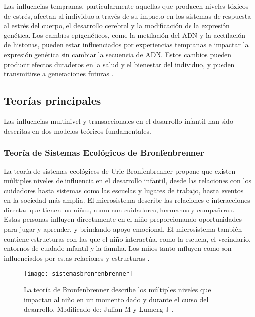 Las influencias tempranas, particularmente aquellas que producen niveles
tóxicos de estrés, afectan al individuo a través de su impacto en los sistemas
de respuesta al estrés del cuerpo, el desarrollo cerebral y la modificación de
la expresión genética. Los cambios epigenéticos, como la metilación del ADN y
la acetilación de histonas, pueden estar influenciados por experiencias
tempranas e impactar la expresión genética sin cambiar la secuencia de ADN.
Estos cambios pueden producir efectos duraderos en la salud y el bienestar del
individuo, y pueden transmitirse a generaciones futuras \cite{Nelson19}.

\subsection{Teorías principales}
Las influencias multinivel y transaccionales en el desarrollo infantil han sido
descritas en dos modelos teóricos fundamentales.

\subsubsection{Teoría de Sistemas Ecológicos de Bronfenbrenner}
La teoría de sistemas ecológicos de Urie Bronfenbrenner propone que existen
múltiples niveles de influencia en el desarrollo infantil, desde las relaciones
con los cuidadores hasta sistemas como las escuelas y lugares de trabajo, hasta
eventos en la sociedad más amplia. El microsistema describe las relaciones e
interacciones directas que tienen los niños, como con cuidadores, hermanos y
compañeros. Estas personas influyen directamente en el niño proporcionando
oportunidades para jugar y aprender, y brindando apoyo emocional. El
microsistema también contiene estructuras con las que el niño interactúa, como
la escuela, el vecindario, entornos de cuidado infantil y la familia. Los niños
tanto influyen como son influenciados por estas relaciones y estructuras
\cite{Feldman3}.

\begin{wrapfigure}{r}[-0.65cm]{0.40\textwidth}
	\centering
    \texttt{[image: sistemasbronfenbrenner]}
	\captionsetup{font=footnotesize}
    \caption{La teoría de Bronfenbrenner describe los múltiples niveles que
    impactan al niño en un momento dado y durante el curso del desarrollo.
    Modificado de: Julian M y Lumeng J \cite{Feldman3}.}
    \label{fig:sistemasbronfenbrenner}
\end{wrapfigure}

